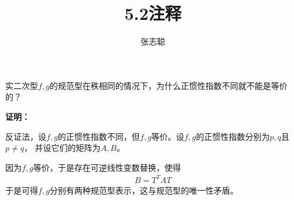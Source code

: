 \documentclass{article}
\begin{document}
\title{5.2注释}
\author{张志聪}
\maketitle

\begin{zremark}
  实二次型$f,g$的规范型在秩相同的情况下，为什么正惯性指数不同就不能是等价的？
\end{zremark}

\textbf{证明：}

反证法，设$f,g$的正惯性指数不同，但$f, g$等价。设$f, g$的正惯性指数分别为$p, q$且$p \neq q$，
并设它们的矩阵为$A, B$。

因为$f, g$等价，于是存在可逆线性变数替换，使得
\begin{align*}
  B = T^T A T
\end{align*}
于是可得$f, g$分别有两种规范型表示，这与规范型的唯一性矛盾。
\end{document}
